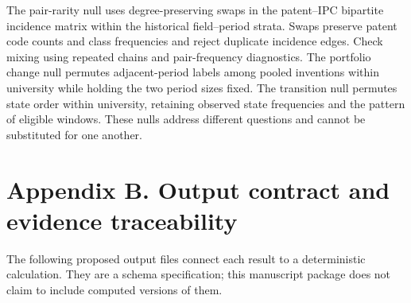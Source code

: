 The pair-rarity null uses degree-preserving swaps in the patent--IPC bipartite
incidence matrix within the historical field--period strata. Swaps preserve
patent code counts and class frequencies and reject duplicate incidence edges.
Check mixing using repeated chains and pair-frequency diagnostics. The portfolio
change null permutes adjacent-period labels among pooled inventions within
university while holding the two period sizes fixed. The transition null permutes
state order within university, retaining observed state frequencies and the
pattern of eligible windows. These nulls address different questions and cannot
be substituted for one another.

\section{Appendix B. Output contract and evidence traceability}\label{app:outputs}
The following proposed output files connect each result to a deterministic
calculation. They are a schema specification; this manuscript package does not
claim to include computed versions of them.

